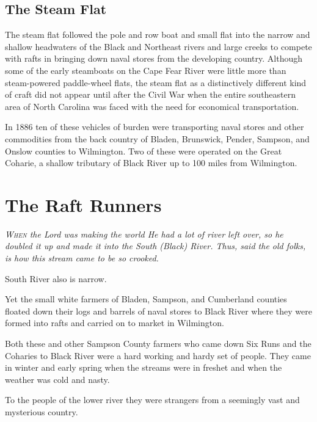 \documentclass[11pt, a5paper]{book}
\begin{document}
\section*{The Steam Flat}

The steam flat followed the pole and row boat and small flat into the
narrow and shallow headwaters of the Black and Northeast rivers and
large creeks to compete with rafts in bringing down naval stores from
the developing country.  Although some of the early steamboats on the
Cape Fear River were little more than steam-powered paddle-wheel
flats, the steam flat as a distinctively different kind of craft did
not appear until after the Civil War when the entire southeastern area
of North Carolina was faced with the need for economical
transportation.\par

In 1886 ten of these vehicles of burden were transporting naval stores
and other commodities from the back country of Bladen, Brunswick,
Pender, Sampson, and Onslow counties to Wilmington.  Two of these were
operated on the Great Coharie, a shallow tributary of Black River up
to 100 miles from Wilmington.  \citep[8-13-86]{ws}\par


\chapter{The Raft Runners}

\textit{\textsc{When} the Lord was making the world He had a lot of
  river left over, so he doubled it up and made it into the South
  (Black) River.  Thus, said the old folks, is how this stream came to
  be so crooked.}  \citep{shawg}\par

South River also is narrow.\par

Yet the small white farmers of Bladen, Sampson, and Cumberland
counties floated down their logs and barrels of naval stores to Black
River where they were formed into rafts and carried on to market in
Wilmington.\par

Both these and other Sampson County farmers who came down Six Runs and
the Coharies to Black River were a hard working and hardy set of
people.  They came in winter and early spring when the streams were in
freshet and when the weather was cold and nasty.\par

To the people of the lower river they were strangers from a seemingly
vast and mysterious country.\par
\end{document}
